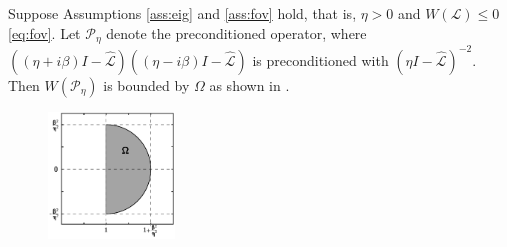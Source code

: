 \documentclass[review]{siamart}
\begin{document}
%
\begin{theorem}\label{th:fov}
Suppose Assumptions \ref{ass:eig} and \ref{ass:fov} hold, that is, $\eta > 0$
and $W(\mathcal{L}) \leq 0$ \eqref{eq:fov}. Let $\mathcal{P}_\eta$ denote the
preconditioned operator, where $((\eta + i\beta)I -
\widehat{\mathcal{L}})((\eta - i\beta)I - \widehat{\mathcal{L}})$ is
preconditioned with $(\eta I - \widehat{\mathcal{L}})^{-2}$. Then 
$W(\mathcal{P}_\eta)$ is bounded by $\Omega$ as shown in .
\begin{figure}[h!]
\centering
\includegraphics[width = 0.3\textwidth]{./figures/fov.pdf}
\caption{}
\label{fig:bound}
\end{figure}
\end{theorem}
\end{document}
